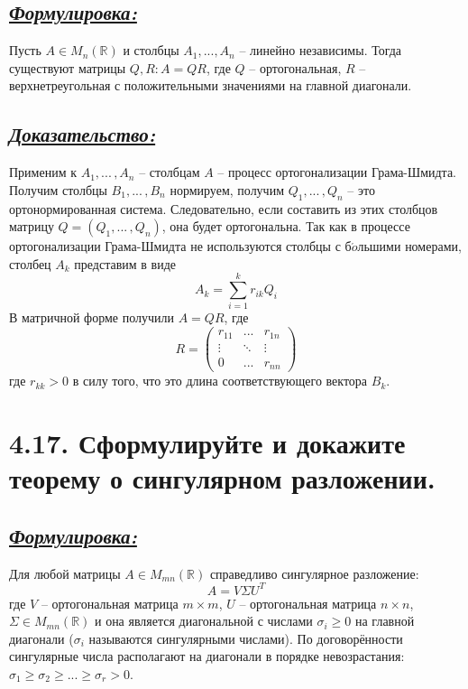 \documentclass{article}
\begin{document}
\subsection*{\Large \underline{\textit{Формулировка: }}}
Пусть $A \in M_n(\mathbb{R})$ и столбцы $A_1, ... , A_n$ -- линейно независимы. Тогда существуют матрицы $Q, R : A = QR$, где $Q$ -- ортогональная, $R$ -- верхнетреугольная с положительными значениями на главной диагонали.

\subsection*{\Large \underline{\textit{Доказательство: }}}
Применим к $A_1, ...\,, A_n$ -- столбцам $A$ -- процесс ортогонализации Грама-Шмидта. Получим столбцы $B_1, ...\,, B_n$ нормируем, получим $Q_1, ...\,, Q_n$ -- это ортонормированная система. Следовательно, если составить из этих столбцов матрицу $Q = (Q_1, ...\,, Q_n)$, она будет ортогональна. Так как в процессе ортогонализации Грама-Шмидта не используются столбцы с б$\acute{o}$льшими номерами, столбец $A_k$ представим в виде $$A_k = \sum_{i = 1}^k r_{ik}Q_i$$
В матричной форме получили $A = QR$, где 
$$
R = 
\begin{pmatrix}
r_{11} & ... & r_{1n} \\
\vdots & \ddots & \vdots \\
0 & ... & r_{nn}
\end{pmatrix}
$$
где $r_{kk} > 0$ в силу того, что это длина соответствующего вектора $B_k$.

\section*{\LARGE 4.17. Сформулируйте и докажите теорему о сингулярном разложении. }
\subsection*{\Large \underline{\textit{Формулировка: }}}
Для любой матрицы $A \in M_{mn}(\mathbb{R})$ справедливо сингулярное разложение:
$$
A = V\Sigma U^T
$$
где $V$ -- ортогональная матрица $m \times m$, $U$ -- ортогональная матрица $n \times n$, $\Sigma \in M_{mn}(\mathbb{R})$ и она является диагональной с числами $\sigma_i \ge 0$ на главной диагонали ($\sigma_i$ называются сингулярными числами). По договорённости сингулярные числа располагают на диагонали в порядке невозрастания: $\sigma_1 \ge \sigma_2 \ge ... \ge \sigma_r > 0$.
\end{document}
